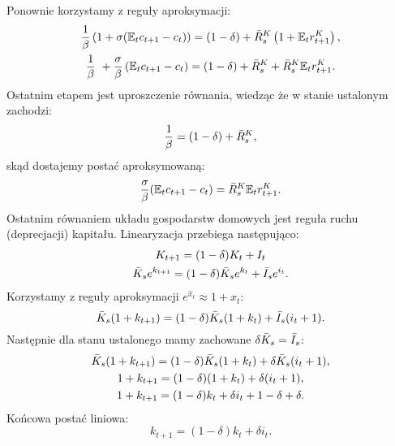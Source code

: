 Ponownie korzystamy z reguły aproksymacji:
\begin{gather}
    \frac{1}{\beta}\left(1 + \sigma(\mathbb{E}_t c_{t+1} - c_t)\right) =  (1 - \delta) + \bar{R}_s^K\left( 1 + \mathbb{E}_t r^K_{t+1}\right), \\
    \frac{1}{\beta}\ + \frac{\sigma}{\beta} \left(\mathbb{E}_t c_{t+1} - c_t\right) = (1 - \delta) + \bar{R}_s^K + \bar{R}_s^K \mathbb{E}_t r^K_{t+1}.
\end{gather}
Ostatnim etapem jest uproszczenie równania, wiedząc że w stanie ustalonym zachodzi:
\begin{equation}
    \frac{1}{\beta} = (1-\delta) + \bar{R}_s^K,
\end{equation}
skąd dostajemy postać aproksymowaną:
\begin{equation}
    \frac{\sigma}{\beta}(\mathbb{E}_t c_{t+1} - c_t) = \bar{R}_s^K \mathbb{E}_t r^K_{t+1}.
\end{equation}
Ostatnim równaniem układu gospodarstw domowych jest reguła ruchu (deprecjacji) kapitału. Linearyzacja przebiega następująco:
\begin{gather}
     K_{t+1} = (1-\delta)K_t + I_t \\
     \bar{K}_s e^{k_{t+1}} = (1-\delta)\bar{K}_s e^{k_t} + \bar{I}_s e^{i_t}.
\end{gather}
Korzystamy z reguły aproksymacji $e^{\hat{x}_t} \approx 1 + \hat{x}_t$:
\begin{equation}
    \bar{K}_s (1 + k_{t+1}) = (1-\delta)\bar{K}_s (1 + k_t) + \bar{I}_s (i_t + 1).
\end{equation}
Następnie dla stanu ustalonego mamy zachowane $\delta\bar{K}_s = \bar{I}_s$:
\begin{gather}
    \bar{K}_s (1 + k_{t+1}) = (1-\delta)\bar{K}_s (1 + k_t) + \delta\bar{K}_s (i_t + 1), \\
    1 + k_{t+1} = (1-\delta)(1 + k_t) + \delta(i_t + 1), \\
    1 + k_{t+1} = (1-\delta)k_t + \delta i_t + 1 - \delta + \delta.
\end{gather}
Końcowa postać liniowa:
\begin{equation}
    k_{t+1} = (1-\delta)k_t + \delta i_t.
\end{equation}

